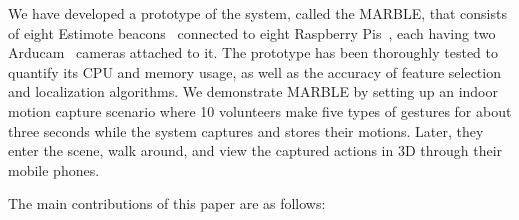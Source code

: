 

We have developed a prototype of the system, called the MARBLE, that consists of eight Estimote beacons~\cite{ESTIMOTE} connected to eight Raspberry Pis~\cite{RPI}, each having two Arducam~\cite{ARDUCAM} cameras attached to it. The prototype has been thoroughly tested to quantify its CPU and memory usage, as well as the accuracy of feature selection and localization algorithms. We demonstrate MARBLE by setting up an indoor motion capture scenario where 10 volunteers make five types of gestures for about three seconds while the system captures and stores their motions. Later, they enter the scene, walk around, and view the captured actions in 3D through their mobile phones.

The main contributions of this paper are as follows:




